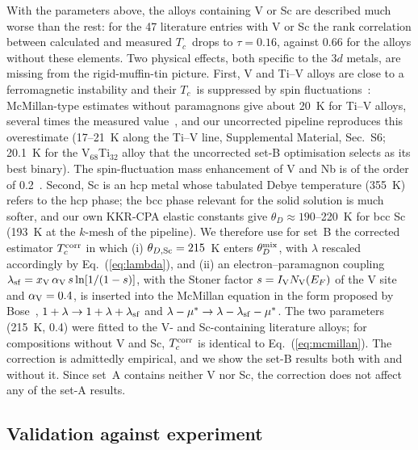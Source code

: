 \documentclass[aps,prb,reprint,superscriptaddress,twocolumn,floatfix]{revtex4-2}
\newcommand{\Tc}{$T_c$}
\newcommand{\SI}[1]{Supplemental Material, Sec.~#1}
\begin{document}
With the parameters above, the alloys containing V or Sc are described much worse than the
rest: for the 47 literature entries with V or Sc the rank correlation between calculated
and measured \Tc\ drops to $\tau = 0.16$, against $0.66$ for the alloys without these elements.
Two physical effects, both specific to the 3$d$ metals, are missing from the rigid-muffin-tin
picture. First, V and Ti--V alloys are close to a ferromagnetic instability and their
\Tc\ is suppressed by spin fluctuations~\cite{Berk1966,RietschelWinter1979,Matin2014}:
McMillan-type estimates without paramagnons give about 20~K for Ti--V alloys, several times
the measured value~\cite{Matin2014}, and our uncorrected pipeline reproduces this
overestimate (17--21~K along the Ti--V line, \SI{S6}; 20.1~K for the V$_{68}$Ti$_{32}$
alloy that the uncorrected set-B optimisation selects as its best binary). The
spin-fluctuation mass enhancement of V and Nb is of the order of
0.2~\cite{RietschelWinter1979}. Second, Sc is an hcp metal whose tabulated Debye temperature (355~K) refers
to the hcp phase; the bcc phase relevant for the solid solution is much softer, and our own
KKR-CPA elastic constants give $\theta_D \approx 190$--220~K for bcc Sc (193~K at the
$k$-mesh of the pipeline). We therefore use for set~B
the corrected estimator $T_c^{\rm corr}$ in which (i) $\theta_{D,{\rm Sc}} = 215$~K enters
$\theta_D^{\rm mix}$, with $\lambda$ rescaled accordingly by
Eq.~(\ref{eq:lambda}), and (ii) an electron--paramagnon coupling
$\lambda_{\rm sf} = x_{\rm V}\,\alpha_{\rm V}\, s\ln[1/(1-s)]$, with the Stoner factor
$s = I_{\rm V} N_{\rm V}(E_F)$ of the V site and $\alpha_{\rm V} = 0.4$, is inserted into
the McMillan equation in the form proposed by Bose~\cite{Bose2009},
$1+\lambda \to 1+\lambda+\lambda_{\rm sf}$ and
$\lambda-\mu^* \to \lambda-\lambda_{\rm sf}-\mu^*$. The two parameters (215~K, 0.4) were
fitted to the V- and Sc-containing literature alloys; for compositions without V and Sc,
$T_c^{\rm corr}$ is identical to Eq.~(\ref{eq:mcmillan}). The correction is admittedly
empirical, and we show the set-B results both with and without it. Since set~A contains
neither V nor Sc, the correction does not affect any of the set-A results.

\subsection{Validation against experiment}
\label{sec:validation}
\end{document}
